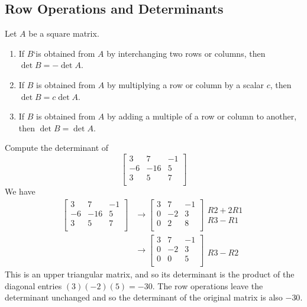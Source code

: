 \documentclass{article}
\begin{document}
\subsection{Row Operations and Determinants}
\begin{theorem}
  Let $A$ be a square matrix.
  \begin{enumerate}
    \item If $B$`is obtained from $A$ by interchanging two rows or columns, then $\det B = -\det A$.
    \item If $B$ is obtained from $A$ by multiplying a row or column by a scalar $c$, then $\det B = c\det A$.
    \item If $B$ is obtained from $A$ by adding a multiple of a row or column to another, then $\det B = \det A$.
  \end{enumerate}
\end{theorem}
\begin{example}
  Compute the determinant of \[
    \begin{bmatrix}
      3 & 7 & -1\\
      -6 & -16 & 5\\
      3 & 5 & 7\\
    \end{bmatrix}
  \]
  We have
  \begin{align*}
    \begin{bmatrix}
      3 & 7 & -1\\
      -6 & -16 & 5\\
      3 & 5 & 7\\
    \end{bmatrix} &\to
    \begin{bmatrix}
      3 & 7 & -1\\
      0 & -2 & 3\\
      0 & 2 & 8\\
    \end{bmatrix}
    \begin{matrix}
      \\
      R2 + 2R1\\
      R3 - R1\\
    \end{matrix}\\
    &\to
    \begin{bmatrix}
      3 & 7 & -1\\
      0 & -2 & 3\\
      0 & 0 & 5\\
    \end{bmatrix}
    \begin{matrix}
      \\
      \\
      R3 - R2\\
    \end{matrix}
  \end{align*}
  This is an upper triangular matrix, and so its determinant is the product of the diagonal entries $(3)(-2)(5) = -30$. The row operations leave the determinant unchanged and so the determinant of the original matrix is also $-30$.
\end{example}
\end{document}
